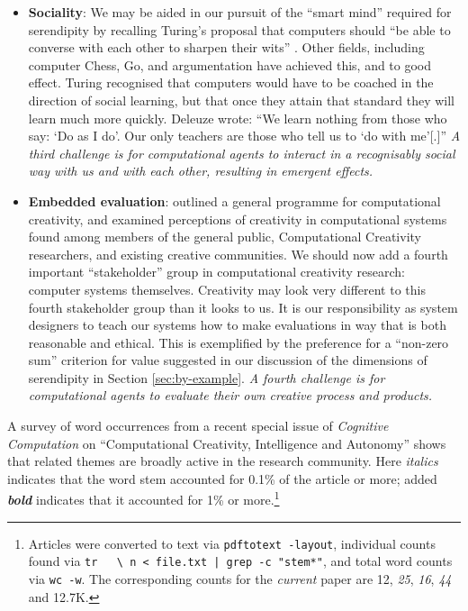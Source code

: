 \begin{itemize}
\item \textbf{Sociality}: We may be aided in our pursuit of the
  ``smart mind'' required for serendipity by recalling Turing's
  proposal that computers should ``be able to converse with each other
  to sharpen their wits'' \cite{turing-intelligent}.  Other fields,
  including computer Chess, Go, and argumentation have achieved this,
  and to good effect.  Turing recognised that computers would have to
  be coached in the direction of social learning, but that once they
  attain that standard they will learn much more quickly.  Deleuze
  \citeyear[p. 26]{deleuze1994difference} wrote: ``We learn nothing
  from those who say: `Do as I do'. Our only teachers are those who
  tell us to `do with me'[.]''  \emph{A third challenge is for
    computational agents to interact in a recognisably social way with
    us and with each other, resulting in emergent effects.}
\end{itemize}

\begin{itemize}
\item \textbf{Embedded evaluation}:
   outlined a general programme
  for computational creativity, and examined perceptions of creativity
  in computational systems found among members of the general public,
  Computational Creativity researchers, and existing creative
  communities.  We should now add a fourth important ``stakeholder''
  group in computational creativity research: computer systems
  themselves.  Creativity may look very different to this fourth
  stakeholder group than it looks to us.  It is our responsibility as
  system designers to teach our systems how to make
  evaluations in way that is both reasonable and ethical.  This is
  exemplified by the preference for a ``non-zero sum'' criterion for
  value suggested in our discussion of the dimensions of serendipity
  in Section \ref{sec:by-example}.  \emph{A fourth challenge is for
    computational agents to evaluate their own creative process and
    products.}
\end{itemize}


A survey of word occurrences from a recent special issue of
\emph{Cognitive Computation} on ``Computational Creativity, Intelligence and Autonomy'' \cite{bishop-erden-special-issue} shows that related themes are broadly
active in the research community.  Here
\emph{italics} indicates that the word stem accounted for 0.1\% of the
article or more; added \textbf{\emph{bold}} indicates that it
accounted for 1\% or more.\footnote{Articles were converted to text
  via {\tt pdftotext -layout}, individual counts found via {\tt tr
    \textquotesingle~\textquotesingle~\textquotesingle\textbackslash
    n\textquotesingle~< file.txt | grep -c "stem*"}, and total word counts
  via {\tt wc -w}.  The corresponding counts for the \emph{current}
  paper are 12, \emph{25}, \emph{16}, \emph{44} and 12.7K.}

